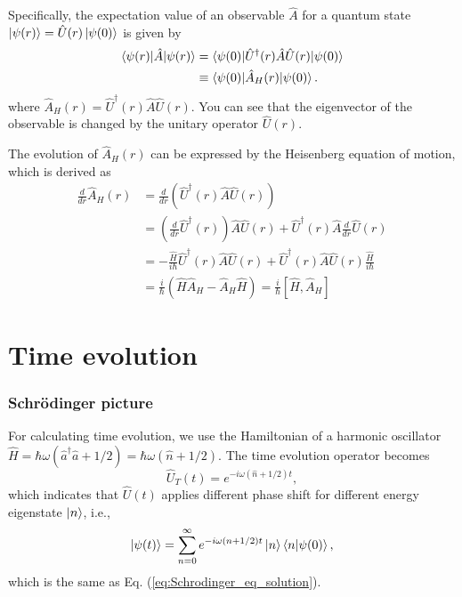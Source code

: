 \documentclass{book}
\begin{document}
Specifically, the expectation value of an observable $\hat A$ for a quantum state $\ket{\psi(r)} = \hat U(r)\ket{\psi(0)}$ is given by
\begin{equation}
\begin{aligned}
  \braket{\psi(r)|\hat A|\psi(r)} &= \braket{\psi(0)|\hat U^\dagger(r)\hat A\hat U(r)|\psi(0)}\\
  &\equiv \braket{\psi(0)|\hat A_H(r)|\psi(0)}.
\end{aligned}
\end{equation}
where $\hat A_H(r) = \hat U^\dagger(r) \hat A \hat U(r)$. You can see that the eigenvector of the observable is changed by the unitary operator $\hat U(r)$.

The evolution of $\hat A_H(r)$ can be expressed by the Heisenberg equation of motion, which is derived as
\begin{equation}
  \begin{aligned}
  	\frac{d}{dr}\hat A_H(r) &= \frac{d}{dr}\left(\hat U^\dagger(r)\hat A\hat U(r)\right)\\
  	&= \left( \frac{d}{dr}\hat U^\dagger(r) \right)\hat A\hat U(r) + \hat U^\dagger(r)\hat A\frac{d}{dr}\hat U(r)\\
  	&= -\frac{\hat H }{i\hbar}\hat U^\dagger(r) \hat A\hat U(r) + \hat U^\dagger(r) \hat A \hat U(r)\frac{\hat H }{i\hbar}\\
  	&= \frac{i}{\hbar}(\hat H\hat A_H - \hat A_H \hat H) = \frac{i}{\hbar}[\hat H, \hat A_H]
  	\label{eq:Heisenberg_eq_motion}
  \end{aligned}
\end{equation}

\section{Time evolution}
\subsubsection{Schr\"odinger picture}
For calculating time evolution, we use the Hamiltonian of a harmonic oscillator $\hat H = \hbar\omega(\hat a^\dagger\hat a + 1/2) = \hbar\omega (\hat n + 1/2)$. The time evolution operator becomes
\begin{equation}
  \hat U_T(t) = e^{-i\omega (\hat n + 1/2)t},
\end{equation}
which indicates that $\hat U(t)$ applies different phase shift for different energy eigenstate $\ket n$, i.e.,
\begin{equation}
  \ket {\psi(t)} = \sum_{n = 0}^{\infty}e^{-i\omega(n+1/2)t}\ket n \braket{n|\psi(0)},
\end{equation}
which is the same as Eq. (\ref{eq:Schrodinger_eq_solution}).
\end{document}
